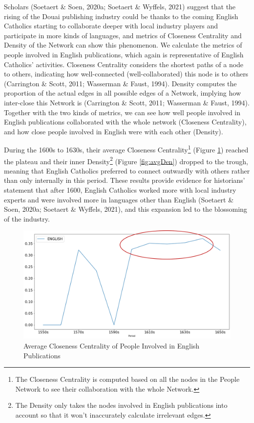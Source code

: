 \documentclass[12pt,a4paper,oneside]{book}
\begin{document}
\begin{sloppypar}
Scholars (Soetaert \& Soen, 2020a; Soetaert \& Wyffels, 2021) suggest that the rising of the Douai publishing industry could be thanks to the coming English Catholics starting to collaborate deeper with local industry players and participate in more kinds of languages, and metrics of Closeness Centrality and Density of the Network can show this phenomenon. We calculate the metrics of people involved in English publications, which again is representative of English Catholics’ activities. Closeness Centrality considers the shortest paths of a node to others, indicating how well-connected (well-collaborated) this node is to others (Carrington \& Scott, 2011; Wasserman \& Faust, 1994). Density computes the proportion of the actual edges in all possible edges of a Network, implying how inter-close this Network is (Carrington \& Scott, 2011; Wasserman \& Faust, 1994). Together with the two kinds of metrics, we can see how well people involved in English publications collaborated with the whole network (Closeness Centrality), and how close people involved in English were with each other (Density).

During the 1600s to 1630s, their average Closeness Centrality\footnote{The Closeness Centrality is computed based on all the nodes in the People Network to see their collaboration with the whole Network.} (Figure \ref{fig:avgClose}) reached the plateau and their inner Density\footnote{The Density only takes the nodes involved in English publications into account so that it won’t inaccurately calculate irrelevant edges.} (Figure \ref{fig:avgDen}) dropped to the trough, meaning that English Catholics preferred to connect outwardly with others rather than only internally in this period. These results provide evidence for historians’ statement that after 1600, English Catholics worked more with local industry experts and were involved more in languages other than English (Soetaert \& Soen, 2020a; Soetaert \& Wyffels, 2021), and this expansion led to the blossoming of the industry.

\begin{figure}[H]
\centering
\includegraphics[scale=0.4]{graph/Average Closeness Centrality of English Publications.png}
\caption{Average Closeness Centrality of People Involved in English Publications}
\label{fig:avgClose}
\end{figure}


\end{sloppypar}
\end{document}
